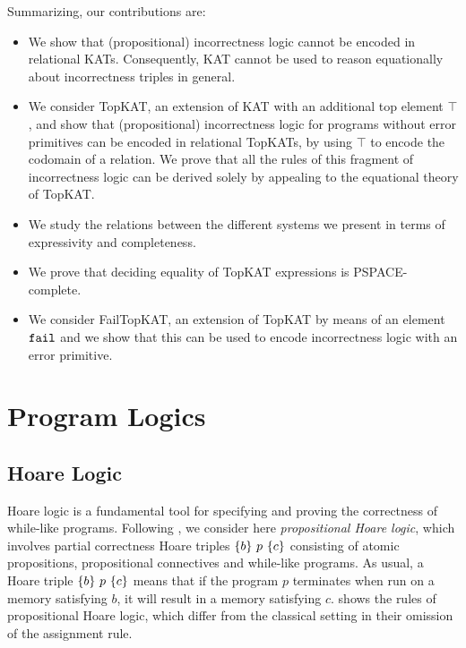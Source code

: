 Summarizing, our contributions are:
\begin{itemize}
\item We show that (propositional) incorrectness logic cannot be encoded in
  relational KATs. Consequently, KAT cannot be used to reason equationally about
  incorrectness triples in general.
\item We consider TopKAT, an extension of KAT with an additional top element
  \(\top\), and show that (propositional) incorrectness logic for programs
  without error primitives can be encoded in relational TopKATs, by using \(\top\)
  to encode the codomain of a relation.  We prove that all the rules of this
  fragment of incorrectness logic can be derived solely by appealing to the
  equational theory of TopKAT\@.
\item We study the relations between the different systems we present
  in terms of expressivity and completeness.
\item We prove that deciding equality of TopKAT expressions is PSPACE-complete.
\item We consider FailTopKAT, an extension of TopKAT by means of an element
  \(\mathtt{fail}\) and we show that this can be used to encode incorrectness logic with
  an error primitive.
\end{itemize}


\section{Program Logics}

\subsection{Hoare Logic}\label{sec:incorrectness-and-hoare}

Hoare logic is a fundamental tool for specifying and proving the correctness of
while-like programs. Following \citet{Kozen_2000}, we consider here
\emph{propositional Hoare logic}, which involves partial correctness Hoare
triples \(\{b\}~p~\{c\}\) consisting of atomic propositions,
propositional connectives and while-like programs.  As usual, a Hoare triple
\(\{b\}~p~\{c\}\) means that if the program \(p\) terminates when run on
a memory satisfying \(b\), it will result in a memory satisfying \(c\).
 shows the rules of propositional Hoare logic, which differ from
the classical setting in their omission of the assignment rule.


